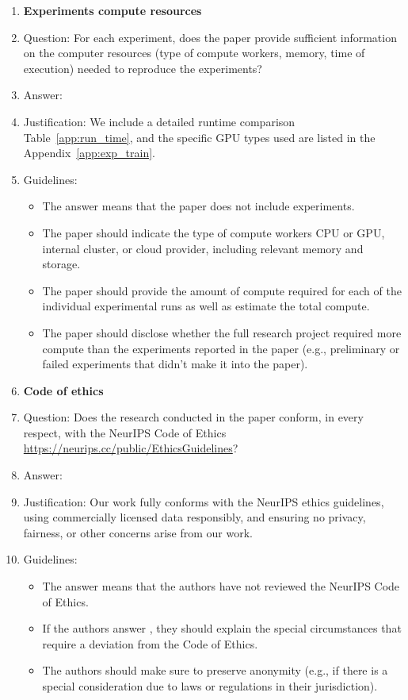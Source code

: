 \documentclass{article}
\begin{document}
\begin{enumerate}
\item {\bf Experiments compute resources}
    \item[] Question: For each experiment, does the paper provide sufficient information on the computer resources (type of compute workers, memory, time of execution) needed to reproduce the experiments?
    \item[] Answer: \answerYes{} %
    \item[] Justification: We include a detailed runtime comparison Table~\ref{app:run_time}, and the specific GPU types used are listed in the Appendix~\ref{app:exp_train}.
    \item[] Guidelines:
    \begin{itemize}
        \item The answer \answerNA{} means that the paper does not include experiments.
        \item The paper should indicate the type of compute workers CPU or GPU, internal cluster, or cloud provider, including relevant memory and storage.
        \item The paper should provide the amount of compute required for each of the individual experimental runs as well as estimate the total compute. 
        \item The paper should disclose whether the full research project required more compute than the experiments reported in the paper (e.g., preliminary or failed experiments that didn't make it into the paper). 
    \end{itemize}
    
\item {\bf Code of ethics}
    \item[] Question: Does the research conducted in the paper conform, in every respect, with the NeurIPS Code of Ethics \url{https://neurips.cc/public/EthicsGuidelines}?
    \item[] Answer: \answerYes{} %
    \item[] Justification: Our work fully conforms with the NeurIPS ethics guidelines, using commercially licensed data responsibly, and ensuring no privacy, fairness, or other concerns arise from our work.
    \item[] Guidelines:
    \begin{itemize}
        \item The answer \answerNA{} means that the authors have not reviewed the NeurIPS Code of Ethics.
        \item If the authors answer \answerNo, they should explain the special circumstances that require a deviation from the Code of Ethics.
        \item The authors should make sure to preserve anonymity (e.g., if there is a special consideration due to laws or regulations in their jurisdiction).
    \end{itemize}



\end{enumerate}
\end{document}
